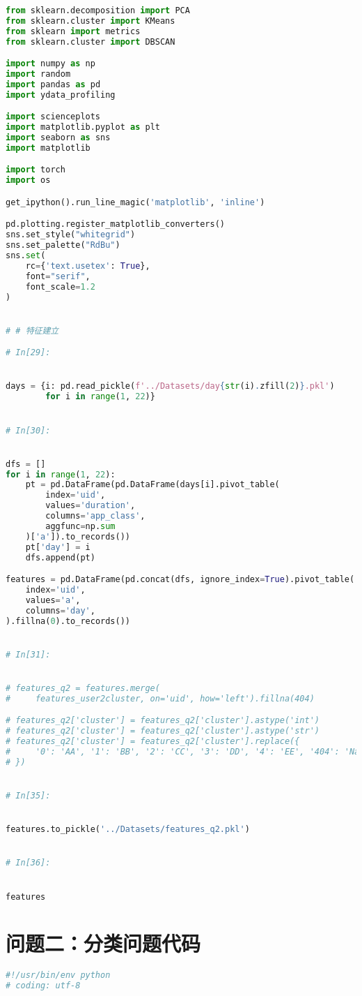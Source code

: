 \documentclass[withoutpreface,bwprint]{cumcmthesis}
\begin{document}
\begin{appendices}
\begin{lstlisting}[language=Python]
from sklearn.decomposition import PCA
from sklearn.cluster import KMeans
from sklearn import metrics
from sklearn.cluster import DBSCAN

import numpy as np
import random
import pandas as pd
import ydata_profiling

import scienceplots
import matplotlib.pyplot as plt
import seaborn as sns
import matplotlib

import torch
import os

get_ipython().run_line_magic('matplotlib', 'inline')

pd.plotting.register_matplotlib_converters()
sns.set_style("whitegrid")
sns.set_palette("RdBu")
sns.set(
    rc={'text.usetex': True},
    font="serif",
    font_scale=1.2
)


# # 特征建立

# In[29]:


days = {i: pd.read_pickle(f'../Datasets/day{str(i).zfill(2)}.pkl')
        for i in range(1, 22)}


# In[30]:


dfs = []
for i in range(1, 22):
    pt = pd.DataFrame(pd.DataFrame(days[i].pivot_table(
        index='uid',
        values='duration',
        columns='app_class',
        aggfunc=np.sum
    )['a']).to_records())
    pt['day'] = i
    dfs.append(pt)

features = pd.DataFrame(pd.concat(dfs, ignore_index=True).pivot_table(
    index='uid',
    values='a',
    columns='day',
).fillna(0).to_records())


# In[31]:


# features_q2 = features.merge(
#     features_user2cluster, on='uid', how='left').fillna(404)

# features_q2['cluster'] = features_q2['cluster'].astype('int')
# features_q2['cluster'] = features_q2['cluster'].astype('str')
# features_q2['cluster'] = features_q2['cluster'].replace({
#     '0': 'AA', '1': 'BB', '2': 'CC', '3': 'DD', '4': 'EE', '404': 'NaN'
# })


# In[35]:


features.to_pickle('../Datasets/features_q2.pkl')


# In[36]:


features
    \end{lstlisting}

    \section{问题二：分类问题代码}
    \begin{lstlisting}[language=Python]
#!/usr/bin/env python
# coding: utf-8


\end{lstlisting}
\end{appendices}
\end{document}
